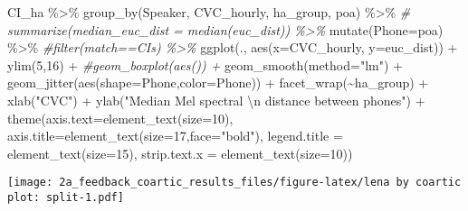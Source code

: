 \documentclass[
]{article}
\newenvironment{Shaded}{\begin{snugshade}}{\end{snugshade}}
\newcommand{\AttributeTok}[1]{\textcolor[rgb]{0.77,0.63,0.00}{#1}}
\newcommand{\CommentTok}[1]{\textcolor[rgb]{0.56,0.35,0.01}{\textit{#1}}}
\newcommand{\DecValTok}[1]{\textcolor[rgb]{0.00,0.00,0.81}{#1}}
\newcommand{\FunctionTok}[1]{\textcolor[rgb]{0.00,0.00,0.00}{#1}}
\newcommand{\NormalTok}[1]{#1}
\newcommand{\SpecialCharTok}[1]{\textcolor[rgb]{0.00,0.00,0.00}{#1}}
\newcommand{\StringTok}[1]{\textcolor[rgb]{0.31,0.60,0.02}{#1}}
\begin{document}
\begin{Shaded}
\begin{Highlighting}[]
\NormalTok{CI\_ha }\SpecialCharTok{\%\textgreater{}\%}
  \FunctionTok{group\_by}\NormalTok{(Speaker, CVC\_hourly, ha\_group, poa) }\SpecialCharTok{\%\textgreater{}\%}
 \CommentTok{\# summarize(median\_euc\_dist = median(euc\_dist)) \%\textgreater{}\%}
  \FunctionTok{mutate}\NormalTok{(}\AttributeTok{Phone=}\NormalTok{poa) }\SpecialCharTok{\%\textgreater{}\%}
  \CommentTok{\#filter(match==\textquotesingle{}CIs\textquotesingle{}) \%\textgreater{}\%}
  \FunctionTok{ggplot}\NormalTok{(., }\FunctionTok{aes}\NormalTok{(}\AttributeTok{x=}\NormalTok{CVC\_hourly, }\AttributeTok{y=}\NormalTok{euc\_dist)) }\SpecialCharTok{+} 
  \FunctionTok{ylim}\NormalTok{(}\DecValTok{5}\NormalTok{,}\DecValTok{16}\NormalTok{) }\SpecialCharTok{+} 
  \CommentTok{\#geom\_boxplot(aes()) + }
  \FunctionTok{geom\_smooth}\NormalTok{(}\AttributeTok{method=}\StringTok{"lm"}\NormalTok{) }\SpecialCharTok{+}
  \FunctionTok{geom\_jitter}\NormalTok{(}\FunctionTok{aes}\NormalTok{(}\AttributeTok{shape=}\NormalTok{Phone,}\AttributeTok{color=}\NormalTok{Phone)) }\SpecialCharTok{+}
  \FunctionTok{facet\_wrap}\NormalTok{(}\SpecialCharTok{\textasciitilde{}}\NormalTok{ha\_group) }\SpecialCharTok{+}
  \FunctionTok{xlab}\NormalTok{(}\StringTok{"CVC"}\NormalTok{) }\SpecialCharTok{+} 
  \FunctionTok{ylab}\NormalTok{(}\StringTok{"Median Mel spectral }\SpecialCharTok{\textbackslash{}n}\StringTok{ distance between phones"}\NormalTok{) }\SpecialCharTok{+} 
  \FunctionTok{theme}\NormalTok{(}\AttributeTok{axis.text=}\FunctionTok{element\_text}\NormalTok{(}\AttributeTok{size=}\DecValTok{10}\NormalTok{),}
      \AttributeTok{axis.title=}\FunctionTok{element\_text}\NormalTok{(}\AttributeTok{size=}\DecValTok{17}\NormalTok{,}\AttributeTok{face=}\StringTok{"bold"}\NormalTok{),}
      \AttributeTok{legend.title =} \FunctionTok{element\_text}\NormalTok{(}\AttributeTok{size=}\DecValTok{15}\NormalTok{),}
      \AttributeTok{strip.text.x =} \FunctionTok{element\_text}\NormalTok{(}\AttributeTok{size=}\DecValTok{10}\NormalTok{)) }
\end{Highlighting}
\end{Shaded}

\texttt{[image: 2a\_feedback\_coartic\_results\_files/figure-latex/lena by coartic plot: split-1.pdf]}
\end{document}
